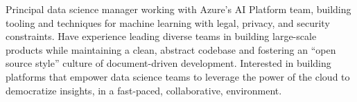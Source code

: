 \documentclass[11pt, letterpaper]{awesome-cv}
\begin{document}
\makecvheader






\begin{cvparagraph}
Principal data science manager working with Azure's AI Platform team, building tooling and techniques for machine learning with legal, privacy, and security constraints.
Have experience leading diverse teams in building large-scale products while maintaining a clean, abstract codebase and fostering an ``open source style'' culture of document-driven development.
Interested in building platforms that empower data science teams to leverage the power of the cloud to democratize insights, in a fast-paced, collaborative, environment.
\end{cvparagraph}





\end{document}
